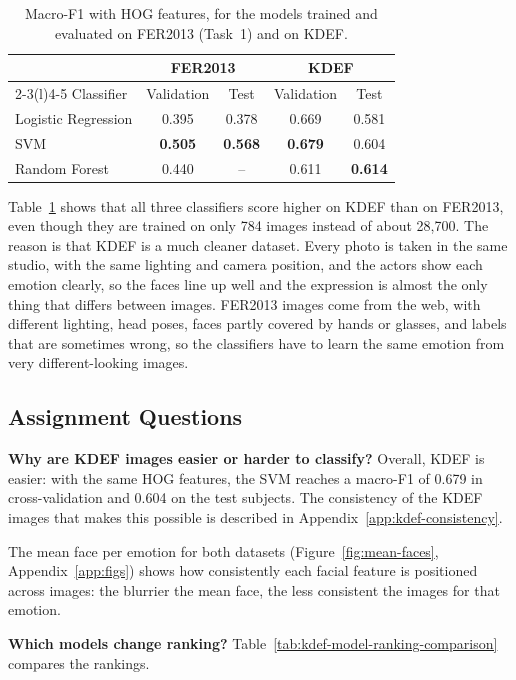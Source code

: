 \begin{table}[h]\centering\small
\begin{tabular}{@{}lcccc@{}}\toprule
 & \multicolumn{2}{c}{FER2013} & \multicolumn{2}{c}{KDEF} \\\cmidrule(lr){2-3}\cmidrule(l){4-5}
Classifier & Validation & Test & Validation & Test \\\midrule
Logistic Regression & 0.395 & 0.378 & 0.669 & 0.581 \\
SVM & \textbf{0.505} & \textbf{0.568} & \textbf{0.679} & 0.604 \\
Random Forest & 0.440 & -- & 0.611 & \textbf{0.614} \\
\bottomrule\end{tabular}
\caption{Macro-F1 with HOG features, for the models trained and evaluated on FER2013 (Task~1) and on KDEF.}
\label{tab:kdef}

\end{table}
Table~\ref{tab:kdef} shows that all three classifiers score higher on KDEF than on FER2013, even though they are trained on only 784 images instead of about 28{,}700. The reason is that KDEF is a much cleaner dataset. Every photo is taken in the same studio, with the same lighting and camera position, and the actors show each emotion clearly, so the faces line up well and the expression is almost the only thing that differs between images. FER2013 images come from the web, with different lighting, head poses, faces partly covered by hands or glasses, and labels that are sometimes wrong, so the classifiers have to learn the same emotion from very different-looking images.


\subsection{Assignment Questions}
\textbf{Why are KDEF images easier or harder to classify?} Overall, KDEF is easier: with the same HOG features, the SVM reaches a macro-F1 of 0.679 in cross-validation and 0.604 on the test subjects. The consistency of the KDEF images that makes this possible is described in Appendix~\ref{app:kdef-consistency}.

The mean face per emotion for both datasets (Figure~\ref{fig:mean-faces}, Appendix~\ref{app:figs}) shows how consistently each facial feature is positioned across images: the blurrier the mean face, the less consistent the images for that emotion.

\textbf{Which models change ranking?} Table~\ref{tab:kdef-model-ranking-comparison} compares the rankings.

